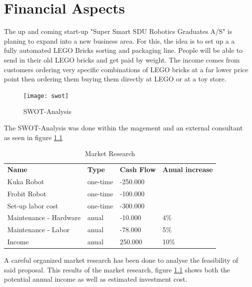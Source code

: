 \chapter{Financial Aspects}\label{chap:financial_aspects_chapter}
The up and coming start-up "Super Smart SDU Robotics Graduates A/S" is planing to expand into a new business area. For this, the idea is to set up a a fully automated LEGO Bricks sorting and packaging line. People will be able to send in their old LEGO bricks and get paid by weight. The income comes from customers ordering very specific combinations of LEGO bricks at a far lower price point then ordering them buying them directly at LEGO or at a toy store. \\
	\begin{figure}[H]
        \centering
        \texttt{[image: swot]}
        \caption{SWOT-Analysis}
        \label{fig:swot}
    \end{figure}
The SWOT-Analysis was done within the magement and an external consultant as seen in figure \ref{fig:swot}
\begin{table}[]
\centering
\begin{tabular}{llll}
\textbf{Name}          & \textbf{Type} & \textbf{Cash Flow} & \textbf{Anual increase} \\
Kuka Robot             & one-time      & -250.000           &                         \\
Frobit Robot           & one-time      & -100.000           &                         \\
Set-up labor cost      & one-time      & -300.000           &                         \\
Maintenance - Hardware & anual         & -10.000            & 4\%                     \\
Maintenance - Labor    & anual         & -78.000            & 5\%                     \\
Income                 & anual         & 250.000            & 10\%                   
\end{tabular}
\caption{Market Research}
\label{tab:market_research}
\end{table}
A careful organized market research has been done to analyse the feasibility of said proposal. This results of the market research, figure \ref{tab:market_research} shows both the potential annual income as well as estimated investment cost.
